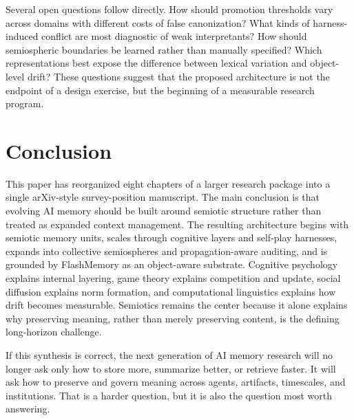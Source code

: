 \documentclass[11pt]{article}
\begin{document}
Several open questions follow directly. How should promotion thresholds vary across domains with different costs of false canonization? What kinds of harness-induced conflict are most diagnostic of weak interpretants? How should semiospheric boundaries be learned rather than manually specified? Which representations best expose the difference between lexical variation and object-level drift? These questions suggest that the proposed architecture is not the endpoint of a design exercise, but the beginning of a measurable research program.

\section{Conclusion}
\label{sec:conclusion}

This paper has reorganized eight chapters of a larger research package into a single arXiv-style survey-position manuscript. The main conclusion is that evolving AI memory should be built around semiotic structure rather than treated as expanded context management. The resulting architecture begins with semiotic memory units, scales through cognitive layers and self-play harnesses, expands into collective semiospheres and propagation-aware auditing, and is grounded by FlashMemory as an object-aware substrate. Cognitive psychology explains internal layering, game theory explains competition and update, social diffusion explains norm formation, and computational linguistics explains how drift becomes measurable. Semiotics remains the center because it alone explains why preserving meaning, rather than merely preserving content, is the defining long-horizon challenge.

If this synthesis is correct, the next generation of AI memory research will no longer ask only how to store more, summarize better, or retrieve faster. It will ask how to preserve and govern meaning across agents, artifacts, timescales, and institutions. That is a harder question, but it is also the question most worth answering.



\end{document}
